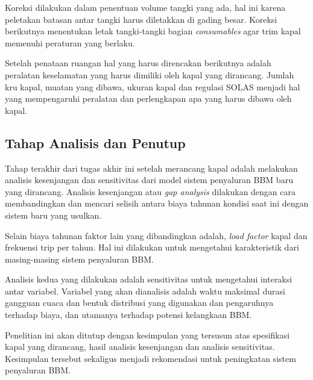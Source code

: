     Koreksi dilakukan dalam penentuan volume tangki yang ada, hal ini karena peletakan batasan antar tangki harus diletakkan di gading besar. Koreksi berikutnya menentukan letak tangki-tangki bagian \emph{consumables} agar trim kapal memenuhi peraturan yang berlaku.

    Setelah penataan ruangan hal yang harus direncakan berikutnya adalah peralatan keselamatan yang harus dimiliki oleh kapal yang dirancang. Jumlah kru kapal, muatan yang dibawa, ukuran kapal dan regulasi SOLAS menjadi hal yang mempengaruhi peralatan dan perlengkapan apa yang harus dibawa oleh kapal.

\subsection{Tahap Analisis dan Penutup}
\label{subsec:tahap-terakhir}

    Tahap terakhir dari tugas akhir ini setelah merancang kapal adalah melakukan analisis kesenjangan dan sensitivitas dari model sistem penyaluran BBM baru yang dirancang. Analisis kesenjangan atau \emph{gap analysis} dilakukan dengan cara membandingkan dan mencari selisih antara biaya tahunan kondisi saat ini dengan sistem baru yang usulkan.

    Selain biaya tahunan faktor lain yang dibandingkan adalah, \emph{load factor} kapal dan frekuensi trip per tahun. Hal ini dilakukan untuk mengetahui karakteristik dari masing-masing sistem penyaluran BBM.

    Analisis kedua yang dilakukan adalah sensitivitas untuk mengetahui interaksi antar variabel. Variabel yang akan dianalisis adalah waktu maksimal durasi gangguan cuaca dan bentuk distribusi yang digunakan dan pengaruhnya terhadap biaya, dan utamanya terhadap potensi kelangkaan BBM.

    Penelitian ini akan ditutup dengan kesimpulan yang tersusun atas spesifikasi kapal yang dirancang, hasil analisis kesenjangan dan analisis sensitivitas. Kesimpulan tersebut sekaligus menjadi rekomendasi untuk peningkatan sistem penyaluran BBM.

    
